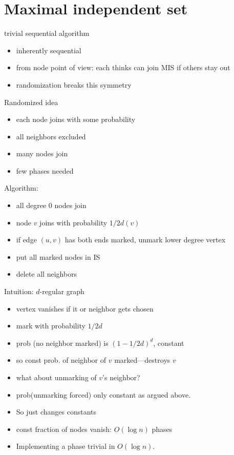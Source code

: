 \documentclass[12pt]{article}
\begin{document}
\section*{Maximal independent set}

trivial sequential algorithm
\begin{itemize}
\item inherently sequential
\item from node point of view: each thinks can join MIS if others stay
  out
\item randomization breaks this symmetry
\end{itemize}

Randomized idea
\begin{itemize}
\item each node joins with some probability
\item all neighbors excluded
\item many nodes join
\item few phases needed
\end{itemize}


Algorithm:
\begin{itemize}
\item all degree 0 nodes join
\item node $v$ joins with probability $1/2d(v)$
\item if edge $(u,v)$ has both ends marked, unmark lower degree vertex
\item put all marked nodes in IS
\item delete all neighbors
\end{itemize}


Intuition: $d$-regular graph
\begin{itemize}
\item vertex vanishes if it or neighbor gets chosen
\item mark with probability $1/2d$
\item prob (no neighbor marked) is $(1-1/2d)^d$, constant
\item so const prob. of neighbor of $v$ marked---destroys $v$
\item what about unmarking of $v$'s neighbor?
\item prob(unmarking forced) only constant as argued above.  
\item So just changes constants
\item const fraction of nodes vanish: $O(\log n)$ phases
\item Implementing a phase trivial in $O(\log n)$.
\end{itemize}
\end{document}
